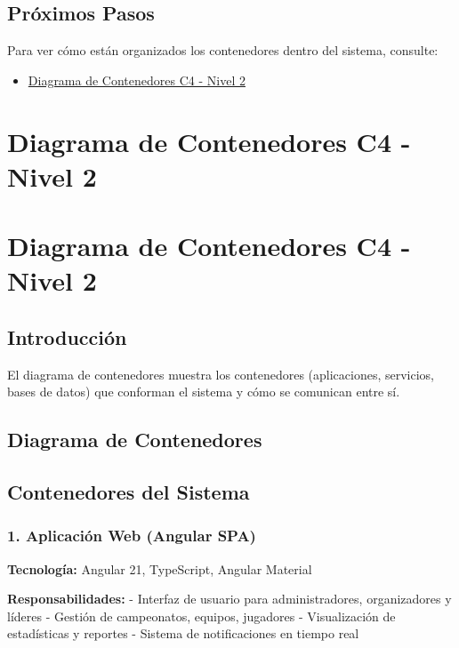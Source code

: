 \documentclass[
  spanish,
  11pt,
  letterpaper,
]{book}
\providecommand{\tightlist}{%
  \setlength{\itemsep}{0pt}\setlength{\parskip}{0pt}}
\begin{document}
\section{Próximos Pasos}\label{pruxf3ximos-pasos-1}

Para ver cómo están organizados los contenedores dentro del sistema,
consulte:

\begin{itemize}
\tightlist
\item
  \href{c4-containers.qmd}{Diagrama de Contenedores C4 - Nivel 2}
\end{itemize}

\chapter{Diagrama de Contenedores C4 - Nivel
2}\label{diagrama-de-contenedores-c4---nivel-2}

\chapter{Diagrama de Contenedores C4 - Nivel
2}\label{diagrama-de-contenedores-c4---nivel-2-1}

\section{Introducción}\label{introducciuxf3n-2}

El diagrama de contenedores muestra los contenedores (aplicaciones,
servicios, bases de datos) que conforman el sistema y cómo se comunican
entre sí.

\section{Diagrama de Contenedores}\label{diagrama-de-contenedores}

\section{Contenedores del Sistema}\label{contenedores-del-sistema}

\subsection{1. Aplicación Web (Angular
SPA)}\label{aplicaciuxf3n-web-angular-spa}

\textbf{Tecnología:} Angular 21, TypeScript, Angular Material

\textbf{Responsabilidades:} - Interfaz de usuario para administradores,
organizadores y líderes - Gestión de campeonatos, equipos, jugadores -
Visualización de estadísticas y reportes - Sistema de notificaciones en
tiempo real
\end{document}
